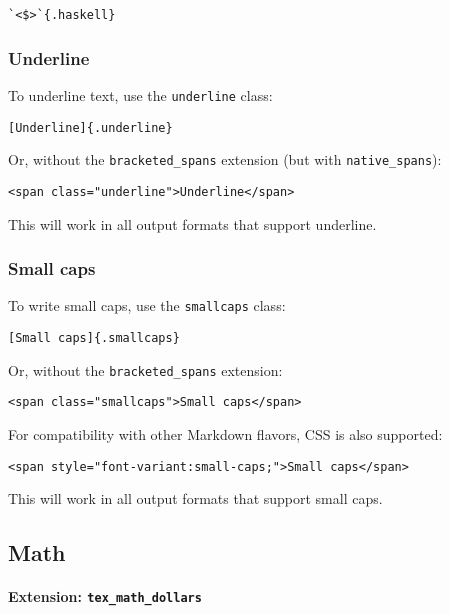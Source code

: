 \documentclass[
]{article}
\begin{document}
\begin{verbatim}
`<$>`{.haskell}
\end{verbatim}

\subsubsection{Underline}\label{underline}

To underline text, use the \texttt{underline} class:

\begin{verbatim}
[Underline]{.underline}
\end{verbatim}

Or, without the \texttt{bracketed\_spans} extension (but with
\texttt{native\_spans}):

\begin{verbatim}
<span class="underline">Underline</span>
\end{verbatim}

This will work in all output formats that support underline.

\subsubsection{Small caps}\label{small-caps}

To write small caps, use the \texttt{smallcaps} class:

\begin{verbatim}
[Small caps]{.smallcaps}
\end{verbatim}

Or, without the \texttt{bracketed\_spans} extension:

\begin{verbatim}
<span class="smallcaps">Small caps</span>
\end{verbatim}

For compatibility with other Markdown flavors, CSS is also supported:

\begin{verbatim}
<span style="font-variant:small-caps;">Small caps</span>
\end{verbatim}

This will work in all output formats that support small caps.

\subsection{Math}\label{math}

\paragraph{\texorpdfstring{Extension:
\texttt{tex\_math\_dollars}}{Extension: tex\_math\_dollars}}\label{extension-tex_math_dollars}
\end{document}
